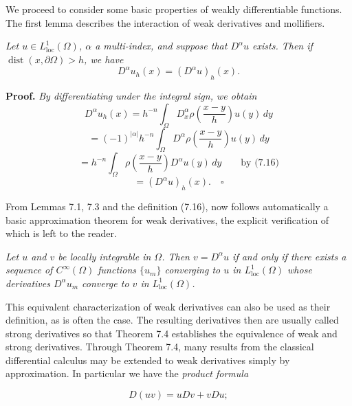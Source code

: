 We proceed to consider some basic properties of weakly differentiable functions.
The first lemma describes the interaction of weak derivatives and mollifiers.

\begin{lemma}\label{gt:lem-sobolev-mollifier-derivative}
\emph{Let $u\in L^1_{\mathrm{loc}}(\Omega)$, $\alpha$ a multi-index, and suppose that $D^\alpha u$ exists. Then
if $\operatorname{dist}(x,\partial\Omega)>h$, we have}
\begin{equation}
\tag{7.17}
D^\alpha u_h(x)=(D^\alpha u)_h(x).
\end{equation}

\textbf{Proof.} \emph{By differentiating under the integral sign, we obtain}
\[
D^\alpha u_h(x)=h^{-n}\int_{\Omega} D_x^\alpha \rho\!\left(\frac{x-y}{h}\right)u(y)\,dy
\]
\[
=(-1)^{|\alpha|}h^{-n}\int_{\Omega} D^\alpha \rho\!\left(\frac{x-y}{h}\right)u(y)\,dy
\]
\[
=h^{-n}\int_{\Omega} \rho\!\left(\frac{x-y}{h}\right)D^\alpha u(y)\,dy \qquad \text{by (7.16)}
\]
\[
=(D^\alpha u)_h(x). \quad \square
\]

From Lemmas 7.1, 7.3 and the definition (7.16), now follows automatically a
basic approximation theorem for weak derivatives, the explicit verification of
which is left to the reader.

\end{lemma}

\begin{theorem}\label{gt:thm-sobolev-weak-derivative-approx}
\emph{Let $u$ and $v$ be locally integrable in $\Omega$. Then $v=D^\alpha u$ if and only
if there exists a sequence of $C^\infty(\Omega)$ functions $\{u_m\}$ converging to $u$ in $L^1_{\mathrm{loc}}(\Omega)$ whose
derivatives $D^\alpha u_m$ converge to $v$ in $L^1_{\mathrm{loc}}(\Omega)$.}
\end{theorem}

This equivalent characterization of weak derivatives can also be used as their
definition, as is often the case. The resulting derivatives then are usually called
strong derivatives so that Theorem 7.4 establishes the equivalence of weak and
strong derivatives. Through Theorem 7.4, many results from the classical differential
calculus may be extended to weak derivatives simply by approximation. In
particular we have the \emph{product formula}

\begin{equation}
\tag{7.18}
D(uv)=uDv+vDu;
\end{equation}


